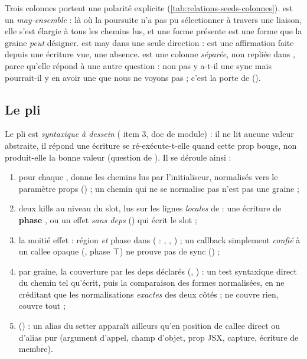 Trois colonnes portent une polarité explicite (\cref{tab:relations-seeds-colonnes}).  est un \emph{may-ensemble} : là où la poursuite n'a pas pu sélectionner à travers une liaison, elle s'est élargie à tous les chemins lus, et une forme présente est une forme que la graine \emph{peut} désigner.  est may dans une seule direction :  est une affirmation faite depuis une écriture vue,  une absence.  est une colonne \emph{séparée}, non repliée dans , parce qu'elle répond à une autre question : non pas \og y a-t-il une sync\fg{} mais \og pourrait-il y en avoir une que nous ne voyons pas\fg{} ; c'est la porte  de  ().

\subsection{Le pli}


Le pli est \emph{syntaxique à dessein} ( item 3, doc de module) : il ne lit aucune valeur abstraite, il répond \og une écriture se ré-exécute-t-elle quand cette prop bouge\fg{}, non \og produit-elle la bonne valeur\fg{} (question de ). Il se déroule ainsi :
\begin{enumerate}
  \item pour chaque ,  donne les chemins lus par l'initialiseur, normalisés vers le paramètre props () ; un chemin qui ne se normalise pas n'est pas une graine ;
  \item deux kills au niveau du slot, lus sur les lignes \emph{locales} de  : une écriture de \textbf{phase} , ou un effet \emph{sans deps} () qui écrit le slot ;
  \item la moitié effet : région  \emph{et} phase dans  ( : , , ) ; un callback simplement \emph{confié} à un callee opaque (, phase ⊤) ne prouve pas de sync () ;
  \item par graine, la couverture par les deps déclarés (, ) : un test syntaxique direct du chemin tel qu'écrit, puis la comparaison des formes normalisées, en ne créditant que les normalisations \emph{exactes} des deux côtés ;  ne couvre rien,  couvre tout ;
  \item {} () : un alias du setter apparaît ailleurs qu'en position de callee direct ou d'alias pur (argument d'appel, champ d'objet, prop JSX, capture, écriture de membre).
\end{enumerate}

